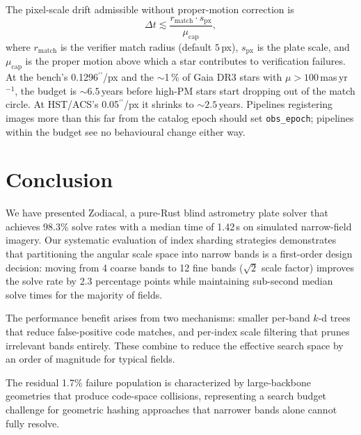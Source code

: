 \documentclass[twocolumn, 10pt]{article}
\newcommand{\arcsec}{\ensuremath{^{\prime\prime}}}
\begin{document}
The pixel-scale drift admissible without proper-motion correction is
\begin{equation} \label{eq:pm-budget}
    \Delta t \lesssim \frac{r_{\text{match}} \cdot s_{\text{px}}}
                            {\mu_{\text{cap}}},
\end{equation}
where $r_{\text{match}}$ is the verifier match radius (default
$5$\,px), $s_{\text{px}}$ is the plate scale, and
$\mu_{\text{cap}}$ is the proper motion above which a star
contributes to verification failures. At the bench's
0.1296\arcsec/px and the $\sim$1\,\% of Gaia DR3 stars with
$\mu > 100$\,mas\,yr$^{-1}$, the budget is $\sim 6.5$\,years before
high-PM stars start dropping out of the match circle. At HST/ACS's
0.05\arcsec/px it shrinks to $\sim 2.5$\,years. Pipelines registering
images more than this far from the catalog epoch should set
\texttt{obs\_epoch}; pipelines within the budget see no behavioural
change either way.

\section{Conclusion} \label{sec:conclusion}

We have presented Zodiacal, a pure-Rust blind astrometry plate solver
that achieves 98.3\% solve rates with a median time of 1.42\,s on
simulated narrow-field imagery. Our systematic evaluation of index
sharding strategies demonstrates that partitioning the angular scale
space into narrow bands is a first-order design decision: moving from
4 coarse bands to 12 fine bands ($\sqrt{2}$ scale factor) improves
the solve rate by 2.3 percentage points while maintaining sub-second
median solve times for the majority of fields.

The performance benefit arises from two mechanisms: smaller per-band
$k$-d trees that reduce false-positive code matches, and per-index
scale filtering that prunes irrelevant bands entirely. These combine
to reduce the effective search space by an order of magnitude for
typical fields.

The residual 1.7\% failure population is characterized by
large-backbone geometries that produce code-space collisions,
representing a search budget challenge for geometric hashing
approaches that narrower bands alone cannot fully resolve.
\end{document}
